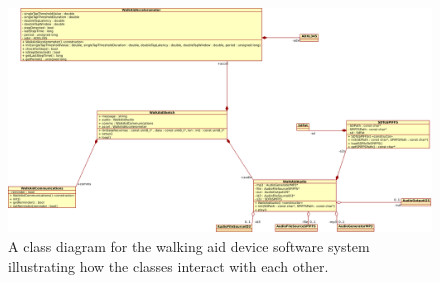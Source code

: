\begin{figure}[ht!]
	\centering
	\captionsetup{width=1.0\linewidth}


	\includegraphics[width=1.0\linewidth]{./UML/WalkingAidDevice/class diagram.png}

	\caption[Walking Aid Device Class Diagram]{A class diagram for the walking aid device software system illustrating how the classes interact with each other.}

	\label{fig:class_diagram_walking_aid}

\end{figure}